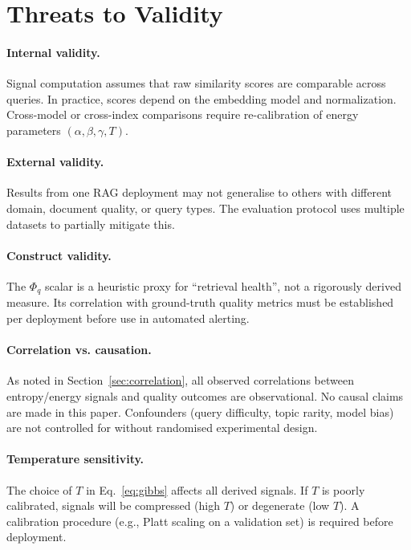\documentclass[11pt,a4paper]{article}
\theoremstyle{definition}
\begin{document}
\section{Threats to Validity}
\label{sec:threats}

\paragraph{Internal validity.}
Signal computation assumes that raw similarity scores are comparable
across queries.
In practice, scores depend on the embedding model and normalization.
Cross-model or cross-index comparisons require re-calibration of
energy parameters $(\alpha, \beta, \gamma, T)$.

\paragraph{External validity.}
Results from one RAG deployment may not generalise to others with
different domain, document quality, or query types.
The evaluation protocol uses multiple datasets to partially mitigate this.

\paragraph{Construct validity.}
The $\Phi_q$ scalar is a heuristic proxy for ``retrieval health'',
not a rigorously derived measure.
Its correlation with ground-truth quality metrics must be established
per deployment before use in automated alerting.

\paragraph{Correlation vs. causation.}
As noted in Section~\ref{sec:correlation}, all observed correlations
between entropy/energy signals and quality outcomes are observational.
No causal claims are made in this paper.
Confounders (query difficulty, topic rarity, model bias) are not
controlled for without randomised experimental design.

\paragraph{Temperature sensitivity.}
The choice of $T$ in Eq.~\eqref{eq:gibbs} affects all derived signals.
If $T$ is poorly calibrated, signals will be compressed (high $T$)
or degenerate (low $T$).
A calibration procedure (e.g., Platt scaling on a validation set)
is required before deployment.
\end{document}
